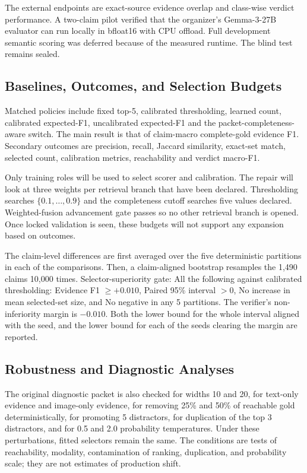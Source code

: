 The external endpoints are exact-source evidence overlap and class-wise verdict performance. A two-claim pilot verified that the organizer's Gemma-3-27B evaluator can run locally in bfloat16 with CPU offload. Full development semantic scoring was deferred because of the measured runtime. The blind test remains sealed.

\subsection{Baselines, Outcomes, and Selection Budgets}

Matched policies include fixed top-5, calibrated thresholding, learned count, calibrated expected-F1, uncalibrated expected-F1 and the packet-completeness-aware switch. The main result is that of claim-macro complete-gold evidence F1. Secondary outcomes are precision, recall, Jaccard similarity, exact-set match, selected count, calibration metrics, reachability and verdict macro-F1.

Only training roles will be used to select scorer and calibration. The repair will look at three weights per retrieval branch that have been declared. Thresholding searches $\{0.1,\ldots,0.9\}$ and the completeness cutoff searches five values declared. Weighted-fusion advancement gate passes so no other retrieval branch is opened. Once locked validation is seen, these budgets will not support any expansion based on outcomes.

The claim-level differences are first averaged over the five deterministic partitions in each of the comparisons. Then, a claim-aligned bootstrap resamples the 1,490 claims 10,000 times. Selector-superiority gate: All the following against calibrated thresholding: Evidence F1 $\geq +0.010$, Paired 95\% interval $> 0$, No increase in mean selected-set size, and No negative in any 5 partitions. The verifier's non-inferiority margin is $-0.010$. Both the lower bound for the whole interval aligned with the seed, and the lower bound for each of the seeds clearing the margin are reported.

\subsection{Robustness and Diagnostic Analyses}

The original diagnostic packet is also checked for widths 10 and 20, for text-only evidence and image-only evidence, for removing 25\% and 50\% of reachable gold deterministically, for promoting 5 distractors, for duplication of the top 3 distractors, and for 0.5 and 2.0 probability temperatures. Under these perturbations, fitted selectors remain the same. The conditions are tests of reachability, modality, contamination of ranking, duplication, and probability scale; they are not estimates of production shift.

